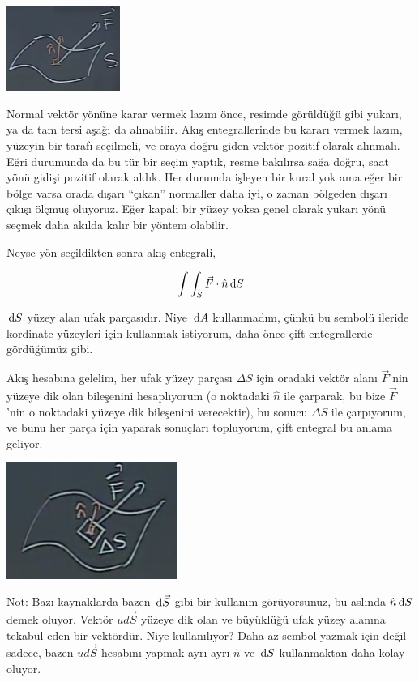 \documentclass[12pt,fleqn]{article}\usepackage{../../common}
\begin{document}
\includegraphics[width=10em]{calc_multi_27_03.png}

Normal vektör yönüne karar vermek lazım önce, resimde görüldüğü gibi yukarı, ya
da tam tersi aşağı da alınabilir. Akış entegrallerinde bu kararı vermek lazım,
yüzeyin bir tarafı seçilmeli, ve oraya doğru giden vektör pozitif olarak
alınmalı. Eğri durumunda da bu tür bir seçim yaptık, resme bakılırsa sağa doğru,
saat yönü gidişi pozitif olarak aldık. Her durumda işleyen bir kural yok ama
eğer bir bölge varsa orada dışarı ``çıkan'' normaller daha iyi, o zaman bölgeden
dışarı çıkışı ölçmuş oluyoruz.  Eğer kapalı bir yüzey yoksa genel olarak yukarı
yönü seçmek daha akılda kalır bir yöntem olabilir.

Neyse yön seçildikten sonra akış entegrali,

$$
\int \int_S \vec{F} \cdot \hat{n} \,\mathrm{d} S
$$

$\,\mathrm{d} S$ yüzey alan ufak parçasıdır. Niye $\,\mathrm{d} A$ kullanmadım, çünkü bu
sembolü ileride kordinate yüzeyleri için kullanmak istiyorum, daha önce
çift entegrallerde gördüğümüz gibi.

Akış hesabına gelelim, her ufak yüzey parçası $\Delta S$ için oradaki vektör
alanı $\vec{F}$'nin yüzeye dik olan bileşenini hesaplıyorum (o noktadaki
$\hat{n}$ ile çarparak, bu bize $\vec{F}$'nin o noktadaki yüzeye dik bileşenini
verecektir), bu sonucu $\Delta S$ ile çarpıyorum, ve bunu her parça için
yaparak sonuçları topluyorum, çift entegral bu anlama geliyor.


\includegraphics[width=15em]{calc_multi_27_04.png}

Not: Bazı kaynaklarda bazen $\,\mathrm{d} \vec{S}$ gibi bir kullanım görüyorsunuz,
bu aslında $\hat{n} \,\mathrm{d} S$ demek oluyor. Vektör $ud \vec{S}$ yüzeye dik
olan ve büyüklüğü ufak yüzey alanına tekabül eden bir vektördür. Niye
kullanılıyor? Daha az sembol yazmak için değil sadece, bazen $ud \vec{S}$
hesabını yapmak ayrı ayrı $\hat{n}$ ve $\,\mathrm{d} S$ kullanmaktan daha
kolay oluyor.
\end{document}
